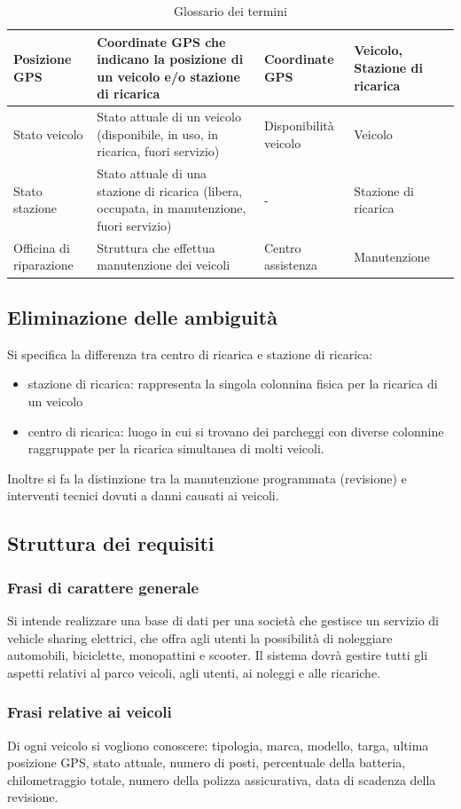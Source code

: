 \documentclass{article}
\begin{document}
\begin{table}[H]
\begin{tabularx}{\textwidth}{|p{2.2cm}|X|p{2.6cm}|p{3cm}|}
Posizione GPS & Coordinate GPS che indicano la posizione di un veicolo e/o stazione di ricarica & Coordinate GPS & Veicolo, Stazione di ricarica \\ \hline
Stato veicolo & Stato attuale di un veicolo (disponibile, in uso, in ricarica, fuori servizio) & Disponibilità veicolo & Veicolo \\ \hline
Stato stazione & Stato attuale di una stazione di ricarica (libera, occupata, in manutenzione, fuori servizio) & - & Stazione di ricarica \\ \hline
Officina di riparazione & Struttura che effettua manutenzione dei veicoli & Centro assistenza & Manutenzione \\ \hline
\end{tabularx}
\caption{Glossario dei termini}
\label{table_glossario_termini}
\end{table}

\subsection{Eliminazione delle ambiguità}
Si specifica la differenza tra centro di ricarica e stazione di ricarica: 
\begin{itemize}
    \item stazione di ricarica: rappresenta la singola colonnina fisica per la ricarica di un veicolo
    \item centro di ricarica: luogo in cui si trovano dei parcheggi con diverse colonnine raggruppate per la ricarica simultanea di molti veicoli.
\end{itemize}
Inoltre si fa la distinzione tra la manutenzione programmata (revisione) e interventi tecnici dovuti a danni causati ai veicoli.


\subsection{Struttura dei requisiti}
\subsubsection{Frasi di carattere generale}
Si intende realizzare una base di dati per una società che gestisce un servizio di vehicle
sharing elettrici, che offra agli utenti la possibilità di noleggiare automobili,
biciclette, monopattini e scooter. Il sistema dovrà gestire tutti gli aspetti relativi
al parco veicoli, agli utenti, ai noleggi e alle ricariche.

\subsubsection{Frasi relative ai veicoli}
Di ogni veicolo si vogliono conoscere: tipologia, marca, modello, targa, ultima posizione GPS, stato attuale, numero di posti, percentuale della batteria, chilometraggio totale, numero della polizza assicurativa, data di scadenza della revisione.
\end{document}
